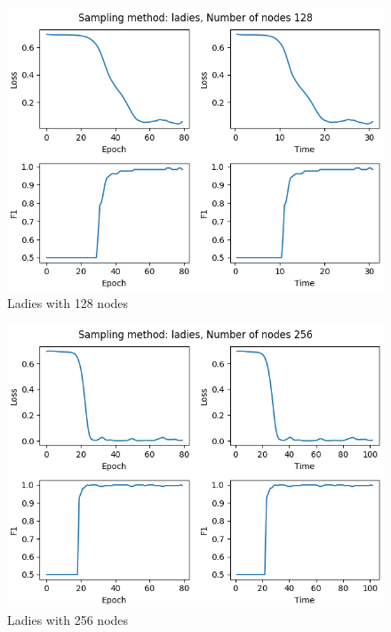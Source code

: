 \begin{figure}[H]
    \centering
    \includegraphics[scale=0.8, ]{assets/plots/ladies_128.png}
    \caption{Ladies with 128 nodes} 
\end{figure}

\begin{figure}[H]
    \centering
    \includegraphics[scale=0.8, ]{assets/plots/ladies_256.png}
    \caption{Ladies with 256 nodes} 
\end{figure}

